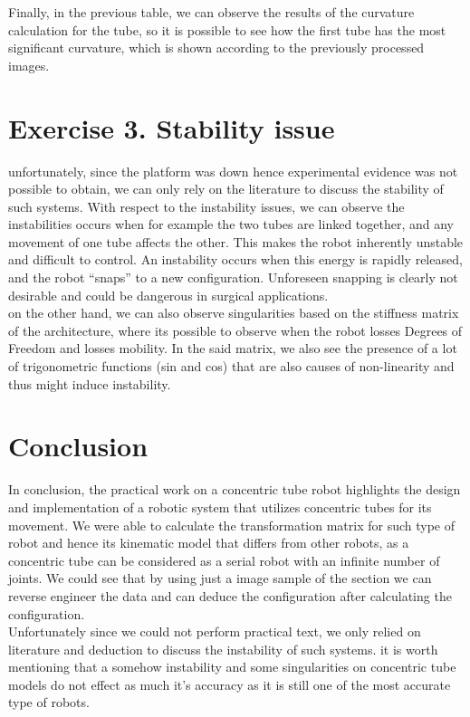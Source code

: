 \documentclass[12pt, twoside]{report}
\begin{document}
Finally, in the previous table, we can observe the results of the curvature calculation for the tube, so it is possible to see how the first tube has the most significant curvature, which is shown according to the previously processed images.
\section{Exercise 3. Stability issue}
unfortunately, since the platform was down hence experimental evidence was not possible to obtain, we can only rely on the literature to discuss the stability of such systems.
With respect to the instability issues, we can observe the instabilities occurs when for example the two tubes are linked together, and any movement of one tube affects the other. This makes the robot inherently unstable and difficult to control. An instability occurs when this energy is rapidly released, and the robot “snaps” to a new configuration. Unforeseen snapping is clearly not desirable and could be dangerous in surgical applications.\\ 
on the other hand, we can also observe singularities based on the stiffness matrix of the architecture, where its possible to observe when the robot losses Degrees of Freedom and losses mobility. In the said matrix, we also see the presence of a lot of trigonometric functions (sin and cos) that are also causes of non-linearity and thus might induce instability.

\section{Conclusion}
In conclusion, the practical work on a concentric tube robot highlights the design and implementation of a robotic system that utilizes concentric tubes for its movement. We were able to calculate the transformation matrix for such type of robot and hence its kinematic model that differs from other robots, as a concentric tube can be considered as a serial robot with an infinite number of joints. We could see that by using just a image sample of the section we can reverse engineer the data and can deduce the configuration after calculating the configuration.\\
Unfortunately since we could not perform practical text, we only relied on literature and deduction to discuss the instability of such systems. it is worth mentioning that a somehow instability and some singularities on concentric tube models do not effect as much  it's accuracy as it is still one of the most accurate type of robots.
\end{document}
